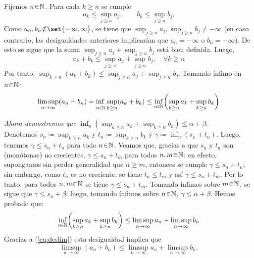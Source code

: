 \begin{sol}
\begin{enumerate}[label=(\roman*)]
Fijemos $n \en \mathbb{N}$. Para cada $k \ge n$ se cumple
\[
a_k \leq \sup_{j \ge n} a_j, \qquad b_k \leq \sup_{j \ge n} b_j.
\]
Como $a_n,b_n\noten\set{-\infty,\infty}$, se tiene que $\sup_{j \ge n} a_j,\sup_{j \ge n} b_j \neq -\infty$ (en caso contrario, las desigualdades anteriores implicarían que $a_n = -\infty$ o $b_n=-\infty$). De esto se sigue que la suma $\sup_{j \ge n} a_j+\sup_{j \ge n} b_j$ está bien definida. Luego, 
\[
a_k + b_k \leq \sup_{j \ge n} a_j + \sup_{j \ge n} b_j,
\quad\forall k\ge n
\]
Por tanto, $\sup_{k \ge n} (a_k + b_k) \leq \sup_{j \ge n} a_j + \sup_{j \ge n} b_j$.
Tomando ínfimo en $n\en\mathbb{N}$:
\begin{equation}\label{eq:deslim}
\limsup_{n\to\infty} (a_n + b_n) 
= \adjustlimits\inf_{n\en\mathbb{N}} \sup_{k \ge n} (a_k + b_k) 
\leq \inf_{n\en\mathbb{N}} \biggl( \sup_{k \ge n} a_k + \sup_{k \ge n} b_k \biggr)
\end{equation}
\par
\emph{Ahora demostremos que $\inf_{n} (\sup_{k \ge n} a_k + \sup_{k \ge n} b_k) \leq \alpha + \beta$}:\\ 
Denotemos $s_n \coloneq \sup_{k\ge n} a_k$ y $t_n\coloneq \sup_{k\ge n} b_k$ y $\gamma \coloneq \inf_{n}(s_n+t_n)$.  Luego, tenemos $\gamma \leq s_n + t_n$ para todo $n\en\mathbb{N}$. Veamos que, gracias a que $s_n$ y $t_n$ son (monótonas) no crecientes, $\gamma \leq s_n+t_m$ para todos $n,m\en\mathbb{N}$: en efecto, supongamos sin perder generalidad que $n \ge m$, entonces se cumple $\gamma \leq s_n + t_n$; sin embargo, como $t_n$ es no creciente, se tiene $t_n \leq t_m$ y así $\gamma \leq s_n + t_m$. Por lo tanto, para todos $n,m\en\mathbb{N}$ se tiene $\gamma\leq s_n + t_m$. Tomando ínfimos sobre $m\en\mathbb{N}$, se sigue que $\gamma \leq s_n + \beta$; luego, tomando ínfimos sobre $n\en\mathbb{N}$, $\gamma \leq \alpha + \beta$. Hemos probado que:
\[
\inf_{n\en\mathbb{N}} \biggl( \sup_{k \ge n} a_k + \sup_{k \ge n} b_k \biggr) \leq \limsup_{n\to\infty}a_n + \limsup_{n\to\infty}b_n
\]
Gracias a (\ref{eq:deslim}) esta desigualdad implica que
\[
\limsup_{n\to\infty} (a_n+b_n) \leq \limsup_{n\to\infty} a_n + \limsup_{n\to\infty} b_n.
\]


\end{enumerate}
\end{sol}
